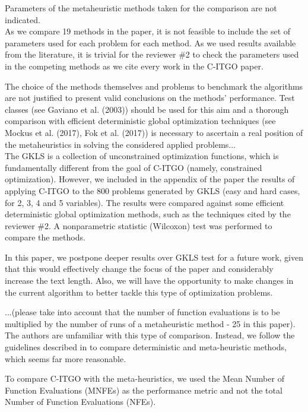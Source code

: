 \vspace{1cm}


{\color{red} Parameters of the metaheuristic methods taken for the comparison are not indicated.} \\

As we compare 19 methods in the paper, it is not feasible to include the set of parameters used for each problem for each method. As we used results available from the literature, it is trivial for the reviewer \#2 to check the parameters used in the competing methods as we cite every work in the C-ITGO paper.


\vspace{1cm}


{\color{red} The choice of the methods themselves and problems to benchmark the algorithms are not justified to present valid conclusions on the methods' performance. Test classes (see Gaviano et al. (2003)) should be used for this aim and a thorough comparison with efficient deterministic global optimization techniques (see Mockus et al. (2017), Fok et al. (2017)) is necessary to ascertain a real position of the metaheuristics in solving the considered applied problems...} \\

The GKLS \citep{GKLS} is a collection of unconstrained optimization functions, which is fundamentally different from the goal of C-ITGO (namely, constrained optimization). However, we included in the appendix of the paper the results of applying C-ITGO to the 800 problems generated by GKLS (easy and hard cases, for 2, 3, 4 and 5 variables). The results were compared against some efficient deterministic global optimization methods, such as the techniques cited by the reviewer \#2. A nonparametric statistic (Wilcoxon) test was performed to compare the methods.

In this paper, we postpone deeper results over GKLS test for a future work, given that this would effectively change the focus of the paper and considerably increase the text length. Also, we will have the opportunity to make changes in the current algorithm to better tackle this type of optimization problems.

\vspace{1cm}



{\color{red} ...(please take into account that the number of function evaluations is to be multiplied by the number of runs of a metaheuristic method - 25 in this paper). } \\

The authors are unfamiliar with this type of comparison. Instead, we follow the guidelines described in \cite{NAT} to compare deterministic and meta-heuristic methods, which seems far more reasonable. 

To compare C-ITGO with the meta-heuristics, we used the Mean Number of Function Evaluations (MNFEs) as the performance metric and not the total Number of Function Evaluations (NFEs).


\vspace{1cm}